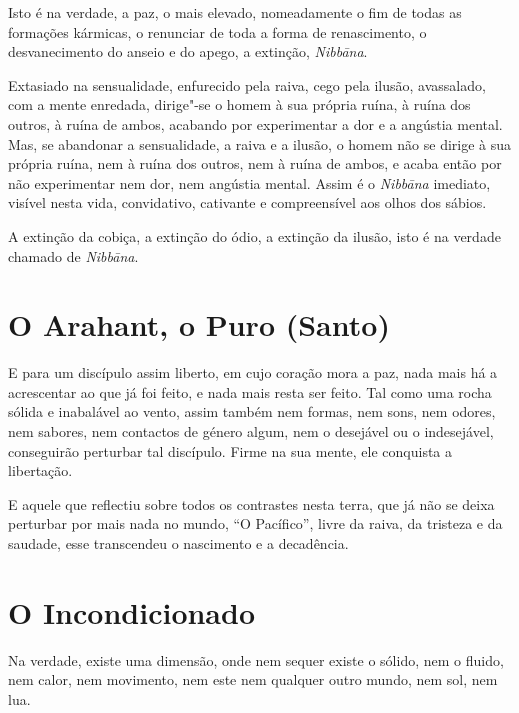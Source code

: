 Isto é na verdade, a paz, o mais elevado, nomeadamente o fim de todas as
formações kármicas, o renunciar de toda a forma de renascimento, o
desvanecimento do anseio e do apego, a extinção, \emph{Nibbāna}.


Extasiado na sensualidade, enfurecido pela raiva, cego pela ilusão, avassalado,
com a mente enredada, dirige"-se o homem à sua própria ruína, à ruína dos outros,
à ruína de ambos, acabando por experimentar a dor e a angústia mental. Mas, se
abandonar a sensualidade, a raiva e a ilusão, o homem não se dirige à sua
própria ruína, nem à ruína dos outros, nem à ruína de ambos, e acaba então por
não experimentar nem dor, nem angústia mental. Assim é o \emph{Nibbāna}
imediato, visível nesta vida, convidativo, cativante e compreensível aos olhos
dos sábios.


A extinção da cobiça, a extinção do ódio, a extinção da ilusão, isto é na
verdade chamado de \emph{Nibbāna}.


\clearpage

\section{O Arahant, o Puro (Santo)}

E para um discípulo assim liberto, em cujo coração mora a paz, nada mais há a
acrescentar ao que já foi feito, e nada mais resta ser feito. Tal como uma rocha
sólida e inabalável ao vento, assim também nem formas, nem sons, nem
odores, nem sabores, nem contactos de género algum, nem o desejável ou o
indesejável, conseguirão perturbar tal discípulo. Firme na sua mente, ele
conquista a libertação.


E aquele que reflectiu sobre todos os contrastes nesta terra, que já não se
deixa perturbar por mais nada no mundo, “O Pacífico”, livre da raiva, da
tristeza e da saudade, esse transcendeu o nascimento e a decadência.


\section{O Incondicionado}

Na verdade, existe uma dimensão, onde nem sequer existe o sólido, nem o fluido,
nem calor, nem movimento, nem este nem qualquer outro mundo, nem sol, nem lua.

